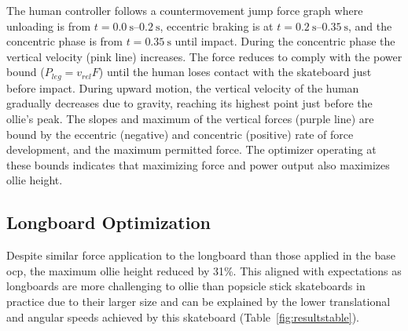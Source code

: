 \documentclass[default,iicol]{sn-jnl}
\begin{document}
The human controller follows a countermovement jump force graph where unloading is from $t=\SIrange{0.0}{0.2}{\second}$, eccentric braking is at $t=\SIrange{0.2}{0.35}{\second}$, and the concentric phase is from $t=\SI{0.35}{\second}$ until impact.
During the concentric phase the vertical velocity (pink line) increases.
The force reduces to comply with the power bound ($P_{leg} = v_{rel} F$) until the human loses contact with the skateboard just before impact.
During upward motion, the vertical velocity of the human gradually decreases due to gravity, reaching its highest point just before the ollie's peak.
The slopes and maximum of the vertical forces (purple line) are bound by the eccentric (negative) and concentric (positive) rate of force development, and the maximum permitted force.
The optimizer operating at these bounds indicates that maximizing force and power output also maximizes ollie height.

\subsection{Longboard Optimization}
%
Despite similar force application to the longboard than those applied in the base \gls{ocp}, the maximum ollie height reduced by 31\%. This aligned with expectations as longboards are more challenging to ollie than popsicle stick skateboards in practice due to their larger size and can be explained by the lower translational and angular speeds achieved by this skateboard (Table~\ref{fig:resultstable}).
\end{document}
